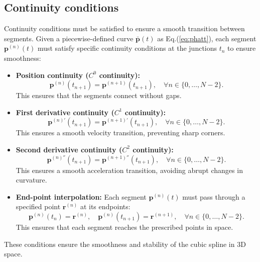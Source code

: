 \subsection{Continuity conditions}\label{sec:continuity}
Continuity conditions must be satisfied to ensure a smooth transition between segments. 
Given a piecewise-defined curve $\mathbf{\bar{p}}(t)$ as Eq.(\ref{eq:phatt}), 
each segment $\mathbf{p}^{(n)}(t)$ must satisfy specific continuity conditions at the junctions $t_n$ to ensure smoothness:
\begin{itemize}
\item \textbf{Position continuity (\( C^0 \) continuity):}  
   \[
   \mathbf{p}^{(n)}(t_{n+1}) = \mathbf{p}^{(n+1)}(t_{n+1}), \quad \forall n \in \{0, \dots, N-2\}.
   \]
   This ensures that the segments connect without gaps.

\item \textbf{First derivative continuity (\( C^1 \) continuity):}  
   \[
   \mathbf{p}^{(n)'}(t_{n+1}) = \mathbf{p}^{(n+1)'}(t_{n+1}), \quad \forall n \in \{0, \dots, N-2\}.
   \]
   This ensures a smooth velocity transition, preventing sharp corners.

\item \textbf{Second derivative continuity (\( C^2 \) continuity):}  
   \[
   \mathbf{p}^{(n)''}(t_{n+1}) = \mathbf{p}^{(n+1)''}(t_{n+1}), \quad \forall n \in \{0, \dots, N-2\}.
   \]
   This ensures a smooth acceleration transition, avoiding abrupt changes in curvature.
\item \textbf{End-point interpolation:}  
   Each segment \(\mathbf{p}^{(n)}(t)\) must pass through a specified point \(\mathbf{r}^{(n)}\) at its endpoints:
   \[
   \mathbf{p}^{(n)}(t_n) = \mathbf{r}^{(n)}, \quad \mathbf{p}^{(n)}(t_{n+1}) = \mathbf{r}^{(n+1)}, \quad \forall n \in \{0, \dots, N-2\}.
   \]
   This ensures that each segment reaches the prescribed points in space.
\end{itemize}

\begin{comment}
For a \textbf{natural cubic spline}, additional boundary conditions are often imposed, such as:
\begin{itemize}
\item \textbf{Clamped spline}: The first derivative at the endpoints is specified
  \[
  \mathbf{p}^{(0)'}(t_0) = \mathbf{v}_0, \quad \mathbf{p}^{(N-1)'}(t_N) = \mathbf{v}_N.
  \]
\item \textbf{Natural spline}: The second derivative at the endpoints is set to zero
  \[
  \mathbf{p}^{(0)''}(t_0) = 0, \quad \mathbf{p}^{(N-1)''}(t_N) = 0.
  \]
\end{itemize}
\end{comment}
These conditions ensure the smoothness and stability of the cubic spline in 3D space.


